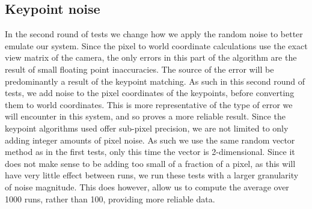 \subsection{Keypoint noise}
\label{subsec:pixel-noise}
In the second round of tests we change how we apply the random noise to better emulate our system. Since the pixel to world coordinate calculations use the exact view matrix of the camera, the only errors in this part of the algorithm are the result of small floating point inaccuracies. The source of the error will be predominantly a result of the keypoint matching. As such in this second round of tests, we add noise to the pixel coordinates of the keypoints, before converting them to world coordinates. This is more representative of the type of error we will encounter in this system, and so proves a more reliable result. Since the keypoint algorithms used offer sub-pixel precision, we are not limited to only adding integer amounts of pixel noise. As such we use the same random vector method as in the first tests, only this time the vector is 2-dimensional. Since it does not make sense to be adding too small of a fraction of a pixel, as this will have very little effect between runs, we run these tests with a larger granularity of noise magnitude. This does however, allow us to compute the average over 1000 runs, rather than 100, providing more reliable data.\\

